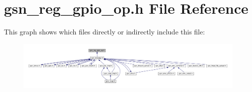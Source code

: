 \hypertarget{a00553}{
\section{gsn\_\-reg\_\-gpio\_\-op.h File Reference}
\label{a00553}
}
This graph shows which files directly or indirectly include this file:
\nopagebreak
\begin{figure}[H]
\begin{center}
\leavevmode
\includegraphics[width=400pt]{a00789}
\end{center}
\end{figure}

